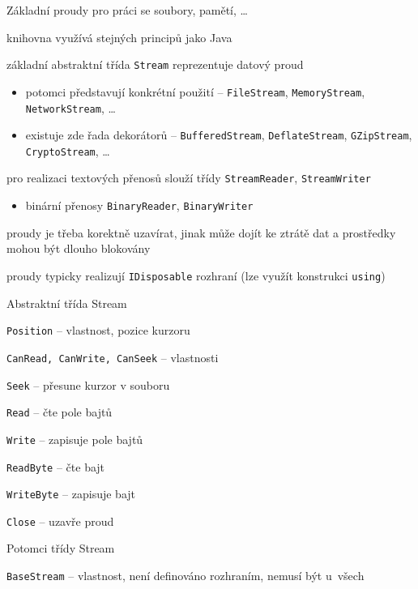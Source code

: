 \begin{frame}[fragile]
\vfill
\begin{bitemize}{Základní proudy pro práci se soubory, pamětí, \ldots}
\item knihovna využívá stejných principů jako Java
\item základní abstraktní třída \lstinline|Stream| reprezentuje datový proud
\begin{itemize}
\item potomci představují konkrétní použití -- \lstinline|FileStream|, \lstinline|MemoryStream|, \lstinline|NetworkStream|, \ldots
\item existuje zde řada dekorátorů -- \lstinline|BufferedStream|, \lstinline|DeflateStream|, \lstinline|GZipStream|, \lstinline|CryptoStream|, \ldots
\end{itemize}
\item pro realizaci textových přenosů slouží třídy \lstinline|StreamReader|, \lstinline|StreamWriter|
\begin{itemize}
\item binární přenosy \lstinline|BinaryReader|, \lstinline|BinaryWriter|
\end{itemize}
\end{bitemize}
\vfill
\begin{bitemize}{}
\item proudy je třeba korektně uzavírat, jinak může dojít ke ztrátě dat a prostředky mohou být dlouho blokovány
\item proudy typicky realizují \lstinline|IDisposable| rozhraní (lze využít konstrukci \lstinline|using|)
\end{bitemize}
\vfill
\end{frame}



\begin{frame}[fragile]
\vfill
\begin{bitemize}{Abstraktní třída Stream}
\item \lstinline|Position| -- vlastnost, pozice kurzoru
\item \lstinline|CanRead, CanWrite, CanSeek| -- vlastnosti
\item \lstinline|Seek| -- přesune kurzor v souboru
\item \lstinline|Read| -- čte pole bajtů
\item \lstinline|Write| -- zapisuje pole bajtů
\item \lstinline|ReadByte| -- čte bajt
\item \lstinline|WriteByte| -- zapisuje bajt
\item \lstinline|Close| -- uzavře proud
\end{bitemize}
\vfill
\begin{bitemize}{Potomci třídy Stream}
\item \lstinline|BaseStream| -- vlastnost, není definováno rozhraním, nemusí být u~všech
\end{bitemize}
\vfill
\end{frame}


